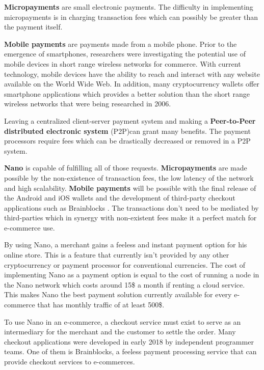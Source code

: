 \documentclass{ferseminar}
\begin{document}
\textbf{Micropayments} are small electronic payments. The difficulty in implementing micropayments is in charging transaction fees which can possibly be greater than the payment itself.

\textbf{Mobile payments} are payments made from a mobile phone. Prior to the emergence of smartphones, researchers were investigating the potential use of mobile devices in short range wireless networks for commerce. With current technology, mobile devices have the ability to reach and interact with any website available on the World Wide Web. In addition, many cryptocurrency wallets offer smartphone applications which provides a better solution than the short range wireless networks that were being researched in 2006.  

Leaving a centralized client-server payment system and making a \textbf{Peer-to-Peer distributed electronic system} (P2P)can grant many benefits. The payment processors require fees which can be drastically decreased or removed in a P2P system.

\textbf{Nano} is capable of fulfilling all of those requests. \textbf{Micropayments} are made possible by the non-existence of transaction fees, the low latency of the network and high scalability. \textbf{Mobile payments} will be possible with the final release of the Android and iOS wallets and the development of third-party checkout applications such as Brainblocks \cite{Brainblocks}. The transactions don't need to be mediated by third-parties which in synergy with non-existent fees make it a perfect match for e-commerce use.

By using Nano, a merchant gains a feeless and instant payment option for his online store. This is a feature that currently isn't provided by any other cryptocurrency or payment processor for conventional currencies. The cost of implementing Nano as a payment option is equal to the cost of running a node in the Nano network which costs around 15\$ a month if renting a cloud service. This makes Nano the best payment solution currently available for every e-commerce that has monthly traffic of at least 500\$.

To use Nano in an e-commerce, a checkout service must exist to serve as an intermediary for the merchant and the customer to settle the order. Many checkout applications were developed in early 2018 by independent programmer teams. One of them is Brainblocks, a feeless payment processing service that can provide checkout services to e-commerces.
\end{document}
